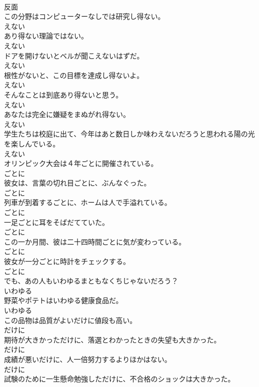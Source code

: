 \documentclass[8pt]{extreport}
\begin{document}
\begin{CJK}{UTF8}{min}
\\	反面	
\\	この分野はコンピューターなしでは研究し得ない。	
\\	えない	
\\	あり得ない理論ではない。	
\\	えない	
\\	ドアを開けないとベルが聞こえないはずだ。	
\\	えない	
\\	根性がないと、この目標を達成し得ないよ。	
\\	えない	
\\	そんなことは到底あり得ないと思う。	
\\	えない	
\\	あなたは完全に嫌疑をまぬがれ得ない。	
\\	えない	
\\	学生たちは校庭に出て、今年はあと数日しか味わえないだろうと思われる陽の光を楽しんでいる。	
\\	えない	
\\	オリンピック大会は４年ごとに開催されている。	
\\	ごとに	
\\	彼女は、言葉の切れ目ごとに、ぶんなぐった。	
\\	ごとに	
\\	列車が到着するごとに、ホームは人で手溢れている。	
\\	ごとに	
\\	一足ごとに耳をそばだてていた。	
\\	ごとに	
\\	この一か月間、彼は二十四時間ごとに気が変わっている。	
\\	ごとに	
\\	彼女が一分ごとに時計をチェックする。	
\\	ごとに	
\\	でも、あの人もいわゆるまともなくちじゃないだろう？	
\\	いわゆる	
\\	野菜やポテトはいわゆる健康食品だ。	
\\	いわゆる	
\\	この品物は品質がよいだけに値段も高い。	
\\	だけに	
\\	期待が大きかっただけに、落選とわかったときの失望も大きかった。	
\\	だけに	
\\	成績が悪いだけに、人一倍努力するよりほかはない。	
\\	だけに	
\\	試験のために一生懸命勉強しただけに、不合格のショックは大きかった。	

\end{CJK}
\end{document}
